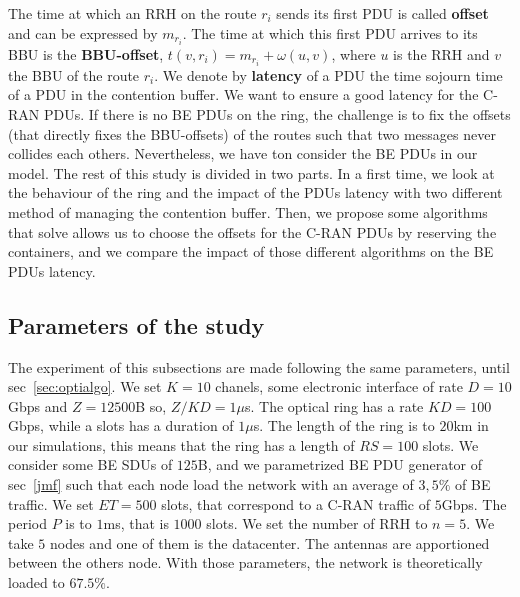 \documentclass[]{algotel}
\begin{document}
  The time at which an RRH on the route $r_i$ sends its first PDU is called {\bf offset} and can be expressed by $m_{r_i}$. The time at which this first PDU arrives to its BBU is the {\bf BBU-offset}, $t(v,r_i) = m_{r_i} + \omega(u,v)$, where $u$ is the RRH and $v$ the BBU of the route $r_i$.
  We denote by {\bf latency} of a PDU the time sojourn time of a PDU in the contention buffer.
  We want to ensure a good latency for the C-RAN PDUs. If there is no BE PDUs on the ring, the challenge is to fix the offsets (that directly fixes the BBU-offsets) of the routes such that two messages never collides each others. Nevertheless, we have ton consider the BE PDUs in our model.
 The rest of this study is divided in two parts. In a first time, we look at the behaviour of the ring and the impact of the PDUs latency with two different method of managing the contention buffer. Then, we propose some algorithms that solve allows us to choose the offsets for the C-RAN PDUs by reserving the containers, and we compare the impact of those different algorithms on the BE PDUs latency.

  \subsection{Parameters of the study}
  \label{sec:parameters} The experiment of this subsections are made following the same parameters, until sec~\ref{sec:optialgo}. We set $K = 10$ chanels, some electronic interface of rate $D=10$Gbps and $Z = 12500$B so, $Z/KD = 1\mu$s. The optical ring has a rate $KD=100$Gbps, while a slots has a duration of $1\mu$s. The length of the ring is to $20$km in our simulations, this means that the ring has a length of $RS = 100$ slots. We consider some BE SDUs of $125$B, and we parametrized BE PDU generator of sec~\ref{jmf} such that each node load the network with an average of $3,5\%$ of BE traffic. We set $ET = 500$ slots, that correspond to a C-RAN traffic of $5$Gbps. The period  $P$ is to $1$ms, that is $1000$ slots. We set the number of RRH to $n=5$. We take $5$ nodes and one of them is the datacenter. The antennas are apportioned between the others node. With those parameters, the network is theoretically loaded to $67.5\%$. 
  
\end{document}
